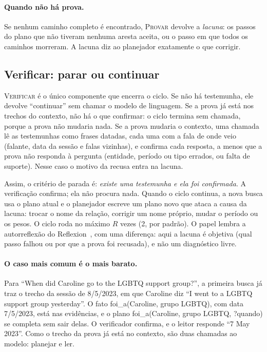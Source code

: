 \documentclass[11pt]{article}
\newcommand{\op}[1]{\textsc{#1}}
\newcommand{\rel}[1]{\textsf{#1}}
\newcommand{\inc}[1]{\textsf{?#1}}
\begin{document}
\paragraph{Quando não há prova.} Se nenhum caminho completo é encontrado,
\op{Provar} devolve a \emph{lacuna}: os passos do plano que não tiveram
nenhuma aresta aceita, ou o passo em que todos os caminhos morreram. A lacuna
diz ao planejador exatamente o que corrigir.

\subsection{Verificar: parar ou continuar}

\op{Verificar} é o único componente que encerra o ciclo. Se não há
testemunha, ele devolve ``continuar'' sem chamar o modelo de linguagem. Se a
prova já está nos trechos do contexto, não há o que confirmar: o ciclo
termina sem chamada, porque a prova não mudaria nada. Se a prova mudaria o
contexto, uma chamada lê as testemunhas como frases datadas, cada uma com a
fala de onde veio (falante, data da sessão e falas vizinhas), e confirma cada
resposta, a menos que a prova não responda à pergunta (entidade, período ou
tipo errados, ou falta de suporte). Nesse caso o motivo da recusa entra na
lacuna.

Assim, o critério de parada é: \emph{existe uma testemunha e ela foi
confirmada}. A verificação confirma; ela não procura nada. Quando o ciclo
continua, a nova busca usa o plano atual e o planejador escreve um plano
novo que ataca a causa da lacuna: trocar o nome da relação, corrigir um nome
próprio, mudar o período ou os pesos. O ciclo roda no máximo $R$ vezes (2,
por padrão). O papel lembra a autorreflexão do
Reflexion~\citep{shinn2023reflexion}, com uma diferença: aqui a lacuna é
objetiva (qual passo falhou ou por que a prova foi recusada), e não um
diagnóstico livre.

\paragraph{O caso mais comum é o mais barato.} Para ``When did Caroline go to
the LGBTQ support group?'', a primeira busca já traz o trecho da sessão de
8/5/2023, em que Caroline diz ``I went to a LGBTQ support group yesterday''.
O fato \rel{foi\_a}(Caroline, grupo LGBTQ), com data 7/5/2023, está nas
evidências, e o plano \rel{foi\_a}(Caroline, grupo LGBTQ, \inc{quando}) se
completa sem sair delas. O verificador confirma, e o leitor responde ``7 May
2023''. Como o trecho da prova já está no contexto, são duas chamadas ao
modelo: planejar e ler.
\end{document}
